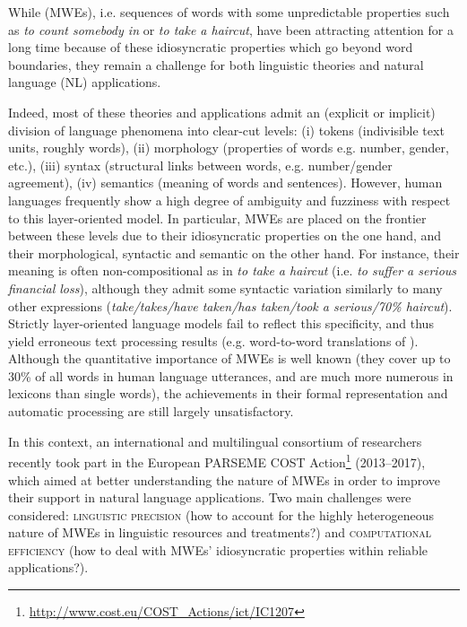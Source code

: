 \begin{refsection}

While  (MWEs), i.e. sequences of words with some
unpredictable properties such as \textit{to count somebody in} or
\textit{to take a haircut}, have been attracting attention for a long
time because of these idiosyncratic properties which go beyond word
boundaries, they remain a challenge for both linguistic theories and
natural language (NL) applications.

Indeed, most of these theories and applications admit an (explicit or
implicit) division of language phenomena into clear-cut levels:
(i) tokens (indivisible text units, roughly words),
(ii) morphology (properties of words e.g. number, gender, etc.),
(iii) syntax (structural links between words, e.g. number/gender agreement),
(iv) semantics (meaning of words and sentences).
However, human languages frequently show a high degree of ambiguity
and fuzziness with respect to this layer-oriented model. In
particular, MWEs are placed on the frontier between these levels due
to their idiosyncratic properties on the one hand, and their
morphological, syntactic and semantic  on the other
hand. For instance, their meaning is often non-compositional as in \textit{to
take a haircut} (i.e. \textit{to suffer a serious financial loss}), although
they admit some syntactic variation similarly to many other
expressions (\textit{take/takes/have taken/has taken/took a serious/70\%
haircut}). Strictly layer-oriented language models fail to reflect
this specificity, and thus yield erroneous text processing results
(e.g. word-to-word translations of ). Although the quantitative
importance of MWEs is well known (they cover up to 30\% of all words
in human language utterances, and are much more numerous in lexicons
than single words), the achievements in their formal representation
and automatic processing are still largely unsatisfactory.

In this context, an international and multilingual consortium of
researchers recently took part in the European PARSEME COST
Action\footnote{\url{http://www.cost.eu/COST_Actions/ict/IC1207}}
(2013--2017), which aimed at better understanding the nature of MWEs in
order to improve their support in natural language applications. Two
main challenges were considered: \textsc{linguistic precision} (how to
account for the highly heterogeneous nature of MWEs in linguistic
resources and treatments?) and \textsc{computational efficiency} (how to
deal with MWEs' idiosyncratic properties within reliable applications?).


\end{refsection}
